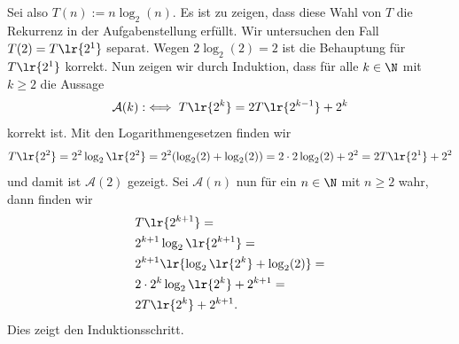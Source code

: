 \begin{myanswer}[myexercise:0503]
	Sei also $T(n) := n\log_2(n)$. Es ist zu zeigen, dass diese Wahl von $T$ die Rekurrenz in der Aufgabenstellung erfüllt. Wir untersuchen den Fall $T(2) = T\lr{2^1}$ separat.
	Wegen $2\log_2(2) = 2$ ist die Behauptung für $T\lr{2^1}$ korrekt. Nun zeigen wir durch Induktion, dass für alle $k\in\N$ mit $k\geq 2$ die Aussage
	\begin{align*}
		\mathcal{A}(k) :\iff T\lr{2^k} = 2T\lr{2^{k-1}} + 2^k
	\end{align*}
	korrekt ist. Mit den Logarithmengesetzen finden wir
	\begin{align*}
		T\lr{2^2} = 2^2\log_2\lr{2^2} = 2^2(\log_2(2) + \log_2(2)) = 2\cdot 2\log_2(2) + 2^2 = 2T\lr{2^1} + 2^2
	\end{align*}
	und damit ist $\mathcal{A}(2)$ gezeigt. Sei $\mathcal{A}(n)$ nun für ein $n\in\N$ mit $n\geq 2$ wahr, dann finden wir
	\begin{align*}
		 & T\lr{2^{k+1}} =                            \\
		 & 2^{k+1}\log_2\lr{2^{k+1}} =                \\
		 & 2^{k+1}\lr{\log_2\lr{2^{k}} + \log_2(2)} = \\
		 & 2\cdot 2^{k}\log_2\lr{2^{k}} + 2^{k+1} =   \\
		 & 2T\lr{2^{k}} + 2^{k+1}.
	\end{align*}
	Dies zeigt den Induktionsschritt.
\end{myanswer}


\clearpage
\shipoutAnswer
